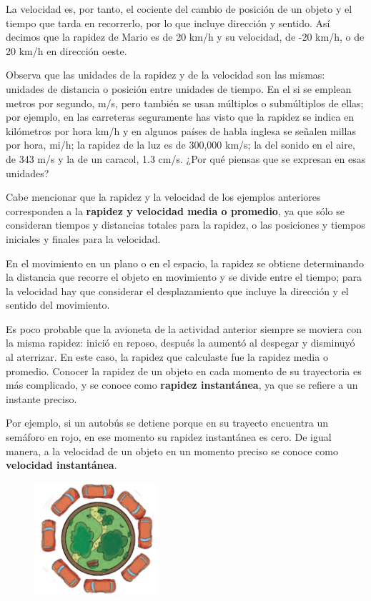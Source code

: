 \documentclass[11pt]{book}
\begin{document}
La velocidad es, por tanto, el cociente del cambio de posición de un objeto y el tiempo que tarda
en recorrerlo, por lo que incluye dirección y sentido. Así decimos que la rapidez de Mario es de
20 km/h y su velocidad, de -20 km/h, o de 20 km/h en dirección oeste.

Observa que las unidades de la rapidez y de la velocidad son las mismas: unidades de distancia
o posición entre unidades de tiempo. En el si se emplean metros por segundo, m/s, pero
también se usan múltiplos o submúltiplos de ellas; por ejemplo, en las carreteras seguramente
has visto que la rapidez se indica en kilómetros por hora km/h y en algunos países de habla
inglesa se señalen millas por hora, mi/h; la rapidez de la luz es de 300,000 km/s;
la del sonido en el aire, de 343 m/s y la de un caracol, 1.3 cm/s. ¿Por qué piensas que
se expresan en esas unidades?

Cabe mencionar que la rapidez y la velocidad de los ejemplos anteriores corresponden a la
\textbf{rapidez y velocidad media o promedio}, ya que sólo se consideran tiempos y distancias totales
para la rapidez, o las posiciones y tiempos iniciales y finales para la velocidad.

En el movimiento en un plano o en el espacio, la rapidez se obtiene determinando la distancia
que recorre el objeto en movimiento y se divide entre el tiempo; para la velocidad hay que
considerar el desplazamiento que incluye la dirección y el sentido del movimiento.

Es poco probable que la avioneta de la actividad anterior siempre se moviera con la misma
rapidez: inició en reposo, después la aumentó al despegar y disminuyó al aterrizar.
En este caso, la rapidez que calculaste fue la rapidez media o promedio. Conocer la rapidez
de un objeto en cada momento de su trayectoria es más complicado, y se conoce como \textbf{rapidez
  instantánea}, ya que se refiere a un instante preciso.

Por ejemplo, si un autobús se detiene porque en su trayecto encuentra un semáforo en rojo,
en ese momento su rapidez instantánea es cero. De igual manera, a la velocidad de un objeto
en un momento preciso se conoce como \textbf{velocidad instantánea}.

\begin{figure}[H]
  \centering
  \includegraphics[width=0.4\textwidth]{glorieta.jpg}
  \label{fig:glorieta}
\end{figure}
\end{document}
